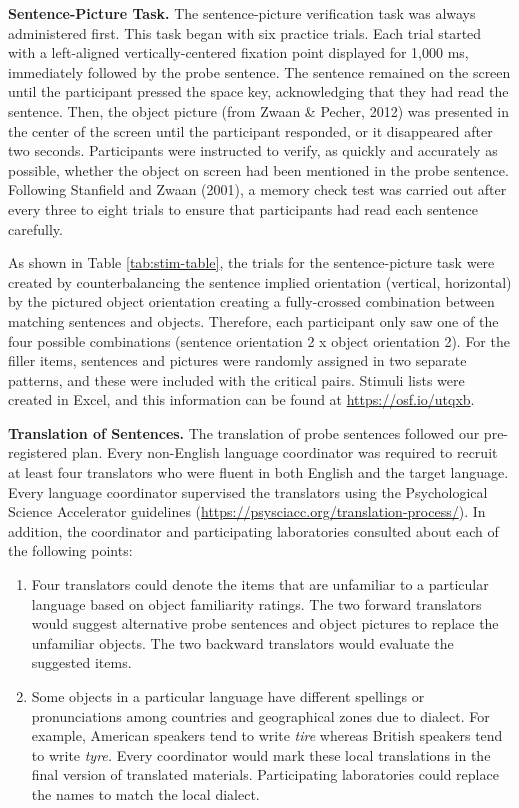 \documentclass[
  man,floatsintext]{apa7}
\begin{document}
\textbf{Sentence-Picture Task.} The sentence-picture verification task was
always administered first. This task began with six practice trials.
Each trial started with a left-aligned vertically-centered fixation
point displayed for 1,000 ms, immediately followed by the probe
sentence. The sentence remained on the screen until the participant
pressed the space key, acknowledging that they had read the sentence.
Then, the object picture (from Zwaan \& Pecher, 2012) was
presented in the center of the screen until the participant responded,
or it disappeared after two seconds. Participants were instructed to
verify, as quickly and accurately as possible, whether the object on
screen had been mentioned in the probe sentence. Following
Stanfield and Zwaan (2001), a memory check test was carried out after every
three to eight trials to ensure that participants had read each sentence
carefully.

As shown in Table \ref{tab:stim-table}, the trials for the
sentence-picture task were created by counterbalancing the sentence
implied orientation (vertical, horizontal) by the pictured object
orientation creating a fully-crossed combination between matching
sentences and objects. Therefore, each participant only saw one of the
four possible combinations (sentence orientation 2 x object orientation
2). For the filler items, sentences and pictures were randomly assigned
in two separate patterns, and these were included with the critical
pairs. Stimuli lists were created in Excel, and this information can be
found at \url{https://osf.io/utqxb}.

\textbf{Translation of Sentences.} The translation of probe sentences
followed our pre-registered plan. Every non-English language coordinator
was required to recruit at least four translators who were fluent in
both English and the target language. Every language coordinator
supervised the translators using the Psychological Science Accelerator
guidelines (\url{https://psysciacc.org/translation-process/}). In addition,
the coordinator and participating laboratories consulted about each of
the following points:

\begin{enumerate}
\def\labelenumi{\arabic{enumi})}
\item
  Four translators could denote the items that are unfamiliar to a
  particular language based on object familiarity ratings. The two
  forward translators would suggest alternative probe sentences and
  object pictures to replace the unfamiliar objects. The two backward
  translators would evaluate the suggested items.
\item
  Some objects in a particular language have different spellings or
  pronunciations among countries and geographical zones due to
  dialect. For example, American speakers tend to write \emph{tire} whereas
  British speakers tend to write \emph{tyre.} Every coordinator would mark
  these local translations in the final version of translated
  materials. Participating laboratories could replace the names to
  match the local dialect.
\end{enumerate}
\end{document}
